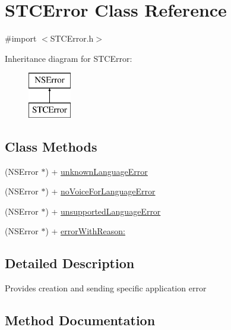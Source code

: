 \hypertarget{interface_s_t_c_error}{}\section{S\+T\+C\+Error Class Reference}
\label{interface_s_t_c_error}


{\ttfamily \#import $<$S\+T\+C\+Error.\+h$>$}

Inheritance diagram for S\+T\+C\+Error\+:\begin{figure}[H]
\begin{center}
\leavevmode
\includegraphics[height=2.000000cm]{interface_s_t_c_error}
\end{center}
\end{figure}
\subsection*{Class Methods}
\begin{DoxyCompactItemize}
\item 
(N\+S\+Error $\ast$) + \hyperlink{interface_s_t_c_error_ab408794baad577ad3a98048cf4b81b79}{unknown\+Language\+Error}
\item 
(N\+S\+Error $\ast$) + \hyperlink{interface_s_t_c_error_adfc5cd1630b5547138c2857180444f7b}{no\+Voice\+For\+Language\+Error}
\item 
(N\+S\+Error $\ast$) + \hyperlink{interface_s_t_c_error_acab90d57e4c1b5e866164d0b6fbcfa14}{unsupported\+Language\+Error}
\item 
(N\+S\+Error $\ast$) + \hyperlink{interface_s_t_c_error_af62d1cad4f7e3e0523d2b16971822086}{error\+With\+Reason\+:}
\end{DoxyCompactItemize}


\subsection{Detailed Description}
Provides creation and sending specific application error 

\subsection{Method Documentation}
\hypertarget{interface_s_t_c_error_af62d1cad4f7e3e0523d2b16971822086}{}\label{interface_s_t_c_error_af62d1cad4f7e3e0523d2b16971822086} 
